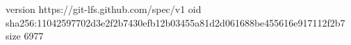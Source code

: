 version https://git-lfs.github.com/spec/v1
oid sha256:11042597702d3e2f2b7430efb12b03455a81d2d061688be455616e917112f2b7
size 6977
